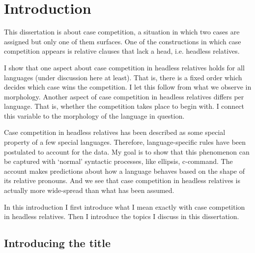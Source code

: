 
\chapter{Introduction}

This dissertation is about case competition, a situation in which two cases are assigned but only one of them surfaces. One of the constructions in which case competition appears is relative clauses that lack a head, i.e. headless relatives.

I show that one aspect about case competition in headless relatives holds for all languages (under discussion here at least). That is, there is a fixed order which decides which case wins the competition. I let this follow from what we observe in morphology. Another aspect of case competition in headless relatives differs per language. That is, whether the competition takes place to begin with. I connect this variable to the morphology of the language in question.

Case competition in headless relatives has been described as some special property of a few special languages. Therefore, language-specific rules have been postulated to account for the data. My goal is to show that this phenomenon can be captured with `normal' syntactic processes, like ellipsis, c-command. The account makes predictions about how a language behaves based on the shape of its relative pronouns. And we see that case competition in headless relatives is actually more wide-spread than what has been assumed.

In this introduction I first introduce what I mean exactly with case competition in headless relatives. Then I introduce the topics I discuss in this dissertation.


\section{Introducing the title}


